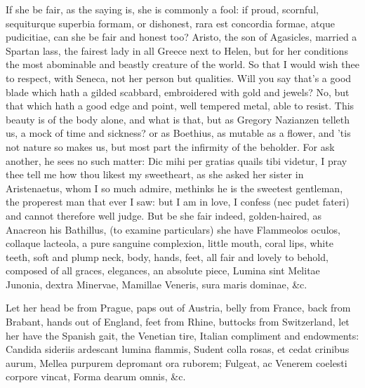 {If she be fair, as the saying is, she is commonly a fool: if proud,
scornful, sequiturque superbia formam, or dishonest, rara est concordia
formae, atque pudicitiae, can she be fair and honest too? 
Aristo, the son of Agasicles, married a Spartan lass, the fairest lady
in all Greece next to Helen, but for her conditions the most abominable
and beastly creature of the world. So that I would wish thee to
respect, with Seneca, not her person but qualities. Will you say
that's a good blade which hath a gilded scabbard, embroidered with gold
and jewels? No, but that which hath a good edge and point, well
tempered metal, able to resist. This beauty is of the body alone, and
what is that, but as  Gregory Nazianzen telleth us, a mock of
time and sickness? or as Boethius, as mutable as a flower, and
'tis not nature so makes us, but most part the infirmity of the
beholder. For ask another, he sees no such matter: Dic mihi per gratias
quails tibi videtur, I pray thee tell me how thou likest my sweetheart,
as she asked her sister in Aristenaetus, whom I so much admire,
methinks he is the sweetest gentleman, the properest man that ever I
saw: but I am in love, I confess (nec pudet fateri) and cannot
therefore well judge. But be she fair indeed, golden-haired, as
Anacreon his Bathillus, (to examine particulars) she have
Flammeolos oculos, collaque lacteola, a pure sanguine complexion,
little mouth, coral lips, white teeth, soft and plump neck, body,
hands, feet, all fair and lovely to behold, composed of all graces,
elegances, an absolute piece,
Lumina sint Melitae Junonia, dextra Minervae,
Mamillae Veneris, sura maris dominae, \&c.

Let her head be from Prague, paps out of Austria, belly from
France, back from Brabant, hands out of England, feet from Rhine,
buttocks from Switzerland, let her have the Spanish gait, the Venetian
tire, Italian compliment and endowments:
Candida sideriis ardescant lumina flammis,
Sudent colla rosas, et cedat crinibus aurum,
Mellea purpurem depromant ora ruborem;
Fulgeat, ac Venerem coelesti corpore vincat,
Forma dearum omnis, \&c.

}
